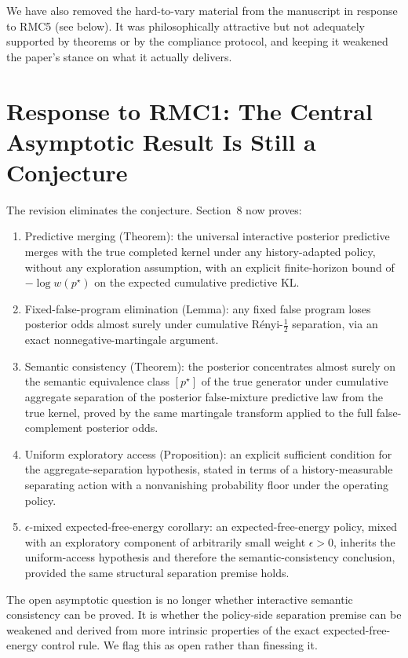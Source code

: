 \documentclass[11pt]{article}
\begin{document}
We have also removed the hard-to-vary material from the manuscript in response to RMC5 (see below). It was philosophically attractive but not adequately supported by theorems or by the compliance protocol, and keeping it weakened the paper's stance on what it actually delivers.

\section*{Response to RMC1: The Central Asymptotic Result Is Still a Conjecture}

The revision eliminates the conjecture. Section~8 now proves:
\begin{enumerate}
\item Predictive merging (Theorem): the universal interactive posterior predictive merges with the true completed kernel under any history-adapted policy, without any exploration assumption, with an explicit finite-horizon bound of $-\log w(p^\star)$ on the expected cumulative predictive KL.
\item Fixed-false-program elimination (Lemma): any fixed false program loses posterior odds almost surely under cumulative R\'enyi-$\tfrac12$ separation, via an exact nonnegative-martingale argument.
\item Semantic consistency (Theorem): the posterior concentrates almost surely on the semantic equivalence class $[p^\star]$ of the true generator under cumulative aggregate separation of the posterior false-mixture predictive law from the true kernel, proved by the same martingale transform applied to the full false-complement posterior odds.
\item Uniform exploratory access (Proposition): an explicit sufficient condition for the aggregate-separation hypothesis, stated in terms of a history-measurable separating action with a nonvanishing probability floor under the operating policy.
\item $\epsilon$-mixed expected-free-energy corollary: an expected-free-energy policy, mixed with an exploratory component of arbitrarily small weight $\epsilon>0$, inherits the uniform-access hypothesis and therefore the semantic-consistency conclusion, provided the same structural separation premise holds.
\end{enumerate}

The open asymptotic question is no longer whether interactive semantic consistency can be proved. It is whether the policy-side separation premise can be weakened and derived from more intrinsic properties of the exact expected-free-energy control rule. We flag this as open rather than finessing it.
\end{document}
